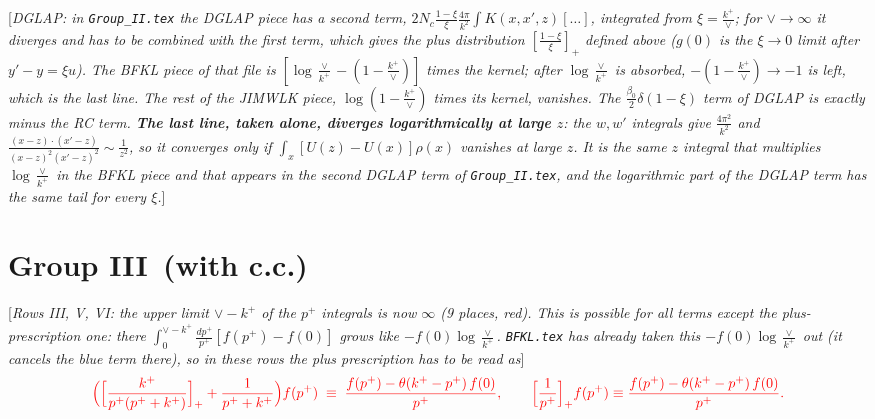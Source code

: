 \documentclass[9pt]{article}
\numberwithin{equation}{section}
\newcommand{\chg}[1]{{\color{red}#1}}
\newcommand{\rnote}[1]{{\color{teal}[\textit{#1}]}}
\begin{document}
\rnote{DGLAP: in \texttt{Group\_II.tex} the DGLAP piece has a second term, $2N_{c}\frac{1-\xi}{\xi}\frac{4\pi}{k^{2}}\int K(x,x',z)[\ldots]$, integrated from $\xi=\frac{k^{+}}{\vee}$; for $\vee\to\infty$ it diverges and has to be combined with the first term, which gives the plus distribution $[\frac{1-\xi}{\xi}]_{+}$ defined above ($g(0)$ is the $\xi\to0$ limit after $y'-y=\xi u$). The BFKL piece of that file is $[\log\frac{\vee}{k^{+}}-(1-\frac{k^{+}}{\vee})]$ times the kernel; after $\log\frac{\vee}{k^{+}}$ is absorbed, $-(1-\frac{k^{+}}{\vee})\to-1$ is left, which is the last line. The rest of the JIMWLK piece, $\log(1-\frac{k^{+}}{\vee})$ times its kernel, vanishes. The $\frac{\beta_{0}}{2}\delta(1-\xi)$ term of DGLAP is exactly minus the RC term. \textbf{The last line, taken alone, diverges logarithmically at large $z$}: the $w,w'$ integrals give $\frac{4\pi^{2}}{k^{2}}$ and $\frac{(x-z)\cdot(x'-z)}{(x-z)^{2}(x'-z)^{2}}\sim\frac{1}{z^{2}}$, so it converges only if $\int_{x}[U(z)-U(x)]\rho(x)$ vanishes at large $z$. It is the same $z$ integral that multiplies $\log\frac{\vee}{k^{+}}$ in the BFKL piece and that appears in the second DGLAP term of \texttt{Group\_II.tex}, and the logarithmic part of the DGLAP term has the same tail for every $\xi$.}

\section{Group III\, (with c.c.)}
\rnote{Rows III, V, VI: the upper limit $\vee-k^{+}$ of the $p^{+}$ integrals is now $\infty$ (9 places, red). This is possible for all terms except the plus-prescription one: there $\int_{0}^{\vee-k^{+}}\frac{dp^{+}}{p^{+}}[f(p^{+})-f(0)]$ grows like $-f(0)\log\frac{\vee}{k^{+}}$. \texttt{BFKL.tex} has already taken this $-f(0)\log\frac{\vee}{k^{+}}$ out (it cancels the blue term there), so in these rows the plus prescription has to be read as}
\begin{align}
\chg{\Big(\Big[\frac{k^{+}}{p^{+}(p^{+}+k^{+})}\Big]_{+}+\frac{1}{p^{+}+k^{+}}\Big)f(p^{+})\;\equiv\;\frac{f(p^{+})-\theta(k^{+}-p^{+})\,f(0)}{p^{+}},\qquad \Big[\frac{1}{p^{+}}\Big]_{+}f(p^{+})\equiv\frac{f(p^{+})-\theta(k^{+}-p^{+})\,f(0)}{p^{+}}.}
\end{align}
\end{document}
